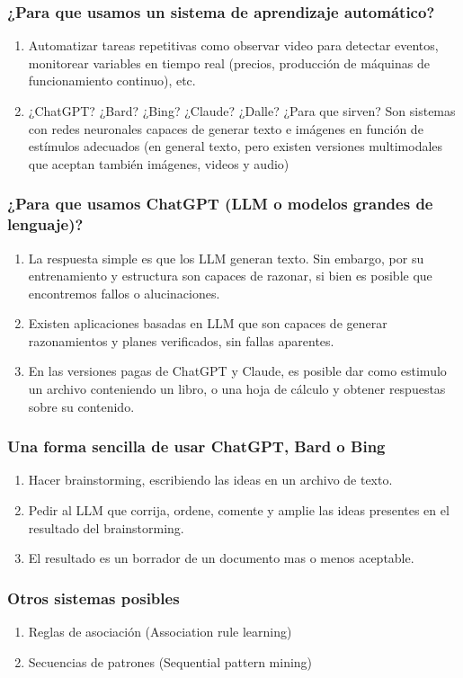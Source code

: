 \documentclass[11pt]{beamer}
\begin{document}
    \begin{frame}
	\frametitle{¿Para que usamos un sistema de aprendizaje automático?}
	\begin{enumerate}
		\item Automatizar tareas repetitivas como observar video para detectar eventos, monitorear variables en tiempo real (precios, producción de máquinas de funcionamiento continuo), etc.
		\item ¿ChatGPT? ¿Bard? ¿Bing? ¿Claude? ¿Dalle? ¿Para que sirven? Son sistemas con redes neuronales capaces de generar texto e imágenes en función de estímulos adecuados (en general texto, pero existen versiones multimodales que aceptan también imágenes, videos y audio)
	\end{enumerate}
    \end{frame}
    \begin{frame}
	\frametitle{¿Para que usamos ChatGPT (LLM o modelos grandes de lenguaje)?}
	\begin{enumerate}
		\item La respuesta simple es que los LLM generan texto. Sin embargo, por su entrenamiento y estructura son capaces de razonar, si bien es posible que encontremos fallos o alucinaciones.
		\item Existen aplicaciones basadas en LLM que son capaces de generar razonamientos y planes verificados, sin fallas aparentes.
		\item En las versiones pagas de ChatGPT y Claude, es posible dar como estimulo un archivo conteniendo un libro, o una hoja de cálculo y obtener respuestas sobre su contenido.
	\end{enumerate}
    \end{frame}
    \begin{frame}
	\frametitle{Una forma sencilla de usar ChatGPT, Bard o Bing}
	\begin{enumerate}
		\item Hacer brainstorming, escribiendo las ideas en un archivo de texto.
		\item Pedir al LLM que corrija, ordene, comente y amplie las ideas presentes en el resultado del brainstorming.
		\item El resultado es un borrador de un documento mas o menos aceptable.
	\end{enumerate}
    \end{frame}

    \begin{frame}
	\frametitle{Otros sistemas posibles}
    	\begin{enumerate}
    		\item Reglas de asociación (Association rule learning)
    		\item Secuencias de patrones (Sequential pattern mining)
    	\end{enumerate}
    \end{frame}
\end{document}
